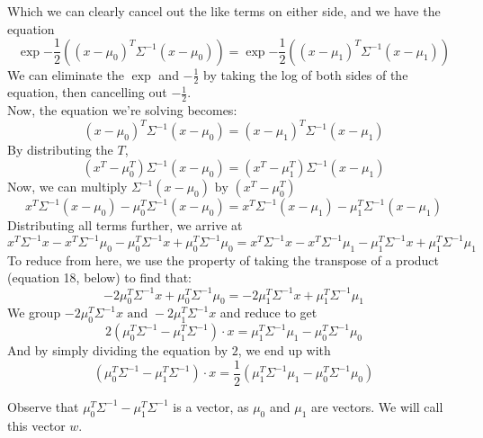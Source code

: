 \documentclass[11pt]{article}
\begin{document}
Which we can clearly cancel out the like terms on either side, and we have the equation
\begin{equation}
\exp{-\frac{1}{2}((x - \mu_0)^T\Sigma^{-1}(x-\mu_0))} = \exp{-\frac{1}{2}((x - \mu_1)^T\Sigma^{-1}(x-\mu_1))}
\end{equation}
We can eliminate the $\exp$ and $-\frac{1}{2}$ by taking the log of both sides of the equation, then cancelling out $-\frac{1}{2}$.\\
Now, the equation we're solving becomes:
\begin{equation}
(x-\mu_0)^T\Sigma^{-1}(x-\mu_0) = (x-\mu_1)^T\Sigma^{-1}(x-\mu_1)
\end{equation}
By distributing the $T$, 
\begin{equation}
(x^T-\mu^T_0)\Sigma^{-1}(x-\mu_0) = (x^T-\mu^T_1)\Sigma^{-1}(x-\mu_1)
\end{equation}
Now, we can multiply $\Sigma^{-1}(x-\mu_0) \text{ by } (x^T-\mu^T_0)$
\begin{equation}
x^T\Sigma^{-1}(x-\mu_0)-\mu^T_0\Sigma^{-1}(x-\mu_0) = x^T\Sigma^{-1}(x-\mu_1)-\mu^T_1\Sigma^{-1}(x-\mu_1)
\end{equation}
Distributing all terms further, we arrive at
\begin{equation}
x^T\Sigma^{-1}x -x^T\Sigma^{-1}\mu_0 - \mu^T_0\Sigma^{-1}x + \mu^T_0\Sigma^{-1}\mu_0 = x^T\Sigma^{-1}x -x^T\Sigma^{-1}\mu_1 - \mu^T_1\Sigma^{-1}x + \mu^T_1\Sigma^{-1}\mu_1
\end{equation}
To reduce from here, we use the property of taking the transpose of a product (equation 18, below) to find that:
\begin{equation}
-2\mu^T_0\Sigma^{-1}x + \mu^T_0\Sigma^{-1}\mu_0 = -2\mu^T_1\Sigma^{-1}x + \mu^T_1\Sigma^{-1}\mu_1
\end{equation}
We group $-2\mu^T_0\Sigma^{-1}x \text{ and } -2\mu^T_1\Sigma^{-1}x$ and reduce to get
\begin{equation}
2(\mu^T_0\Sigma^{-1} - \mu^T_1\Sigma^{-1}) \cdot x = \mu^T_1\Sigma^{-1}\mu_1 - \mu^T_0\Sigma^{-1}\mu_0
\end{equation}
And by simply dividing the equation by $2$, we end up with
\begin{equation}
(\mu^T_0\Sigma^{-1} - \mu^T_1\Sigma^{-1}) \cdot x = \frac{1}{2}(\mu^T_1\Sigma^{-1}\mu_1 - \mu^T_0\Sigma^{-1}\mu_0)
\end{equation}


\noindent Observe that $\mu^T_0\Sigma^{-1} - \mu^T_1\Sigma^{-1}$ is a vector, as $\mu_0$ and $\mu_1$ are vectors. We will call this vector $w$.\\
\end{document}
